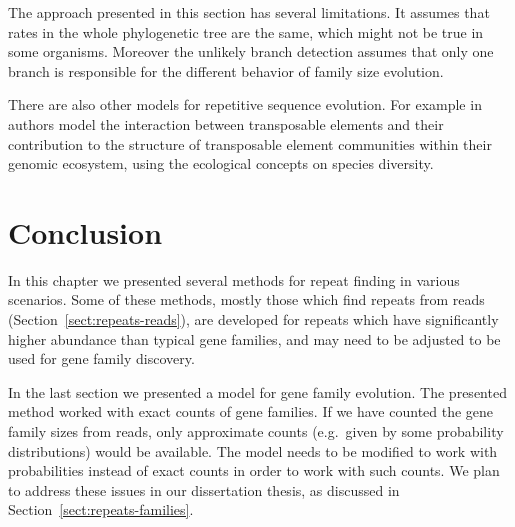 The approach presented in this section has several limitations. It assumes that rates in the whole phylogenetic tree are the same, which might not be true in some organisms. Moreover the unlikely branch detection assumes that only one branch is responsible for the different behavior of family size evolution.

There are also other models for repetitive sequence evolution. For example in~\cite{venner2009dynamics} authors model the interaction between transposable elements and their contribution to the structure of transposable element communities within their genomic ecosystem, using the ecological concepts on species diversity.

\section{Conclusion}

In this chapter we presented several methods for repeat finding in various scenarios.
Some of these methods, mostly those which find repeats from reads (Section~\ref{sect:repeats-reads}), are developed for repeats which have significantly higher abundance than typical gene families, and may need to be adjusted to be used for gene family discovery.

In the last section we presented a model for gene family evolution. The presented method worked with exact counts of gene families. If we have counted the gene family sizes from reads, only approximate counts (e.g.\ given by some probability distributions) would be available. The model needs to be modified to work with probabilities instead of exact counts in order to work with such counts.
We plan to address these issues in our dissertation thesis, as discussed in Section~\ref{sect:repeats-families}.
